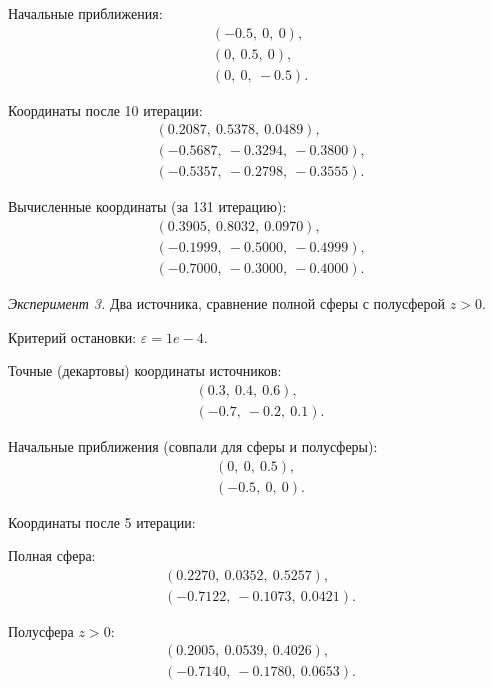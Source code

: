 Начальные приближения:
\begin{align}
    (-0.5,\ 0,\ 0) \text{,}\nonumber\\
    (0,\ 0.5,\ 0) \text{,}\nonumber\\
    (0,\ 0,\ -0.5) \text{.}\nonumber
\end{align}

Координаты после 10 итерации:
\begin{align}
    (0.2087,\ 0.5378,\ 0.0489) \text{,}\nonumber\\
    (-0.5687,\ -0.3294,\ -0.3800) \text{,}\nonumber\\
    (-0.5357,\ -0.2798,\ -0.3555) \text{.}\nonumber
\end{align}

Вычисленные координаты (за 131 итерацию):
\begin{align}
    (0.3905,\ 0.8032,\ 0.0970) \text{,}\nonumber\\
    (-0.1999,\ -0.5000,\ -0.4999) \text{,}\nonumber\\
    (-0.7000,\ -0.3000,\ -0.4000) \text{.}\nonumber
\end{align}

\emph{Эксперимент 3.} Два источника, сравнение полной сферы с полусферой $z > 0$.

Критерий остановки: $\varepsilon = 1e-4$.

Точные (декартовы) координаты источников:
\begin{align}
    (0.3,\ 0.4,\ 0.6) \text{,}\nonumber\\
    (-0.7,\ -0.2,\ 0.1) \text{.}\nonumber
\end{align}

Начальные приближения (совпали для сферы и полусферы):
\begin{align}
    (0,\ 0,\ 0.5) \text{,}\nonumber\\
    (-0.5,\ 0,\ 0) \text{.}\nonumber
\end{align}

Координаты после 5 итерации:

Полная сфера:
\begin{align}
    (0.2270,\ 0.0352,\ 0.5257) \text{,}\nonumber\\
    (-0.7122,\ -0.1073,\ 0.0421) \text{.}\nonumber
\end{align}

Полусфера $z > 0$:
\begin{align}
    (0.2005,\ 0.0539,\ 0.4026) \text{,}\nonumber\\
    (-0.7140,\ -0.1780,\ 0.0653) \text{.}\nonumber
\end{align}

